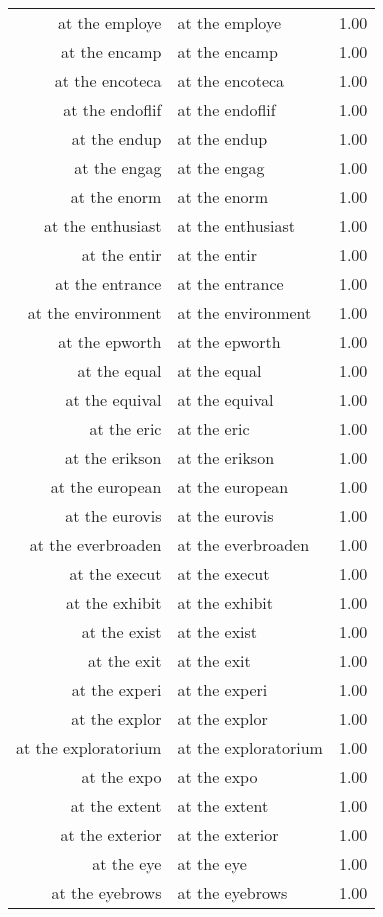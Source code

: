 \begin{table}[ht]
\begin{tabular}{rlr}
  at the employe & at the employe & 1.00 \\ 
  at the encamp & at the encamp & 1.00 \\ 
  at the encoteca & at the encoteca & 1.00 \\ 
  at the endoflif & at the endoflif & 1.00 \\ 
  at the endup & at the endup & 1.00 \\ 
  at the engag & at the engag & 1.00 \\ 
  at the enorm & at the enorm & 1.00 \\ 
  at the enthusiast & at the enthusiast & 1.00 \\ 
  at the entir & at the entir & 1.00 \\ 
  at the entrance & at the entrance & 1.00 \\ 
  at the environment & at the environment & 1.00 \\ 
  at the epworth & at the epworth & 1.00 \\ 
  at the equal & at the equal & 1.00 \\ 
  at the equival & at the equival & 1.00 \\ 
  at the eric & at the eric & 1.00 \\ 
  at the erikson & at the erikson & 1.00 \\ 
  at the european & at the european & 1.00 \\ 
  at the eurovis & at the eurovis & 1.00 \\ 
  at the everbroaden & at the everbroaden & 1.00 \\ 
  at the execut & at the execut & 1.00 \\ 
  at the exhibit & at the exhibit & 1.00 \\ 
  at the exist & at the exist & 1.00 \\ 
  at the exit & at the exit & 1.00 \\ 
  at the experi & at the experi & 1.00 \\ 
  at the explor & at the explor & 1.00 \\ 
  at the exploratorium & at the exploratorium & 1.00 \\ 
  at the expo & at the expo & 1.00 \\ 
  at the extent & at the extent & 1.00 \\ 
  at the exterior & at the exterior & 1.00 \\ 
  at the eye & at the eye & 1.00 \\ 
  at the eyebrows & at the eyebrows & 1.00 \\ 

\end{tabular}
\end{table}
